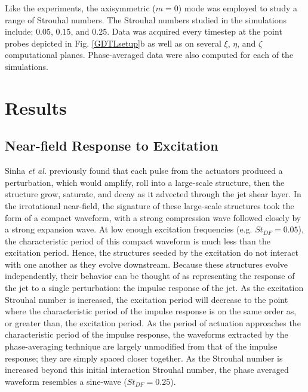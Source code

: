 \documentclass[english]{aiaa-tc}
\begin{document}
Like the experiments, the axisymmetric ($m=0$) mode was employed to study a range of Strouhal numbers. The Strouhal numbers studied in the simulations include: $0.05$, $0.15$, and $0.25$. Data was acquired every timestep at the point probes depicted in Fig. \ref{GDTLsetup}b as well as on several $\xi$, $\eta$, and $\zeta$ computational planes. Phase-averaged data were also computed for each of the simulations. 



\section{Results}\label{results}

\subsection{Near-field Response to Excitation}
Sinha {\em et al.} \cite{sinha2013} previously found that each pulse from the actuators produced a perturbation, which would amplify, roll into a large-scale structure, then the structure grow, saturate, and decay as it advected through the jet shear layer. In the irrotational near-field, the signature of these large-scale structures took the form of a compact waveform, with a strong compression wave followed closely by a strong expansion wave. At low enough excitation frequencies (e.g. $St_{DF} = 0.05$), the characteristic period of this compact waveform is much less than the excitation period. Hence, the structures seeded by the excitation do not interact with one another as they evolve downstream. Because these structures evolve independently, their behavior can be thought of as representing the response of the jet to a single perturbation: the impulse response of the jet. As the excitation Strouhal number is increased, the excitation period will decrease to the point where the characteristic period of the impulse response is on the same order as, or greater than, the excitation period. As the period of actuation approaches the characteristic period of the impulse response, the waveforms extracted by the phase-averaging technique are largely unmodified from that of the impulse response; they are simply spaced closer together. As the Strouhal number is increased beyond this initial interaction Strouhal number, the phase averaged waveform resembles a sine-wave ($St_{DF}=0.25$). 
\end{document}
